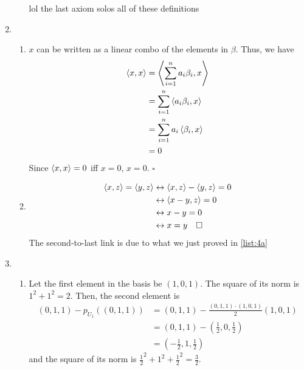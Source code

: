 \documentclass[12pt]{article}
\begin{document}
\begin{enumerate}
\begin{enumerate}
                        \small{lol the last axiom solos all of these definitions}
            \end{enumerate}
      \item \begin{enumerate}
                  \item $x$ can be written as a linear combo of the elements in $\beta$.
                        Thus, we have
                        \begin{align*}
                              \braket{x, x} & = \Braket{\sum_{i=1}^{n} a_i \beta_i, x} \\
                                            & = \sum_{i=1}^{n} \braket{a_i \beta_i, x} \\
                                            & = \sum_{i=1}^{n} a_i \braket{\beta_i, x} \\
                                            & = 0
                        \end{align*}
                        Since $\braket{x, x}=0$ iff $x=0$, $x=0$. $\square$ \label{list:4a}
                  \item \begin{align*}
                              \braket{x, z}=\braket{y, z} & \leftrightarrow \braket{x, z}-\braket{y, z}=0 \\
                                                          & \leftrightarrow \braket{x-y, z}= 0            \\
                                                          & \leftrightarrow x-y=0                         \\
                                                          & \leftrightarrow x=y\quad\square
                        \end{align*}
                        The second-to-last link is due to what we just proved in \ref{list:4a}
            \end{enumerate}
      \item \begin{enumerate}
                  \item Let the first element in the basis be $(1, 0, 1)$.
                        The square of its norm is $1^2+1^2=2$.
                        Then, the second element is
                        \begin{align*}
                              (0, 1, 1) - p_{U_1}((0, 1, 1)) & = (0, 1, 1) - \frac{(0, 1, 1) \cdot (1, 0, 1)}{2}(1, 0, 1) \\
                                                             & = (0, 1, 1) - \left(\frac{1}{2}, 0, \frac{1}{2}\right)     \\
                                                             & = \left(-\frac{1}{2}, 1, \frac{1}{2}\right)
                        \end{align*}
                        and the square of its norm is $\frac{1}{2}^2+1^2+\frac{1}{2}^2=\frac{3}{2}$.


\end{enumerate}
\end{enumerate}
\end{document}
